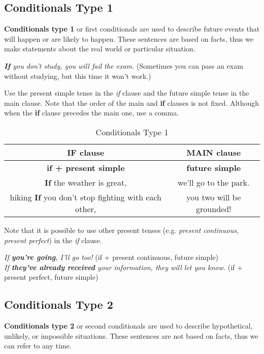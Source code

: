 \documentclass[hidelinks,10pt,a4paper]{article}
\begin{document}
\subsection{Conditionals Type 1}
\textbf{Conditionals type 1} or first conditionals are used to describe future events that will happen or are likely to happen. These sentences are based on facts, thus we make statements about the real world or particular situation.

\begin{center}
	\textit{\textbf{If} you don't study, you will fail the exam.} (Sometimes you can pass an exam without studying, but this time it won't work.)
\end{center}

Use the present simple tense in the \textit{if} clause and the future simple tense in the main clause. Note that the order of the main and \textbf{if} clauses is not fixed. Although when the \textbf{if} clause precedes the main one, use a comma.

\begin{table}[h]
\begin{center}
\begin{tabular}{|c|c|}
	\hline
	\textbf{IF clause} & \textbf{MAIN clause} \\ \hline
	\textbf{if + present simple} & \textbf{future simple} \\ \hline
	\textbf{If} the weather is great, & we'll go to the park. \\ hiking
	\textbf{If} you don't stop fighting with each other, & you two will be grounded! \\ \hline
\end{tabular}
\end{center}
\caption{Conditionals Type 1} \label{tab:ct1t}
\end{table}

Note that it is possible to use other present tenses (e.g. \textit{present continuous, present perfect}) in the \textit{if} clause.

\begin{center}
	\textit{If \textbf{you're going}, I'll go too!} (if + present continuous, future simple)\\
	\textit{If \textbf{they've already received} your information, they will let you know.} (if + present perfect, future simple)
\end{center}

\subsection{Conditionals Type 2}
\textbf{Conditionals type 2} or second conditionals are used to describe hypothetical, unlikely, or impossible situations. These sentences are not based on facts, thus we can refer to any time.
\end{document}
